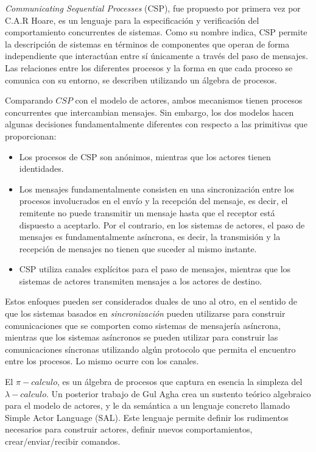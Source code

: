 \documentclass{article}
\begin{document}
\emph{Communicating Sequential Processes} (CSP), fue propuesto por primera vez por C.A.R Hoare\cite{Hoare:1978:CSP:359576.359585}, es un lenguaje para la especificación y verificación del comportamiento concurrentes de sistemas. Como su nombre indica, CSP permite la descripción de sistemas en términos de componentes que operan de forma independiente que interactúan entre sí únicamente a través del paso de mensajes. Las relaciones entre los diferentes procesos y la forma en que cada proceso se comunica con su entorno, se describen utilizando un álgebra de procesos.

Comparando $CSP$ con el modelo de actores, ambos mecanismos tienen procesos concurrentes que intercambian mensajes. Sin embargo, los dos modelos hacen algunas decisiones fundamentalmente diferentes con respecto a las primitivas que proporcionan:

\begin{itemize}
\item Los procesos de CSP son anónimos, mientras que los actores tienen identidades.
\item Los mensajes fundamentalmente consisten en una sincronización entre los procesos involucrados en el envío y la recepción del mensaje, es decir, el remitente no puede transmitir un mensaje hasta que el receptor está dispuesto a aceptarlo. Por el contrario, en los sistemas de actores, el paso de mensajes es fundamentalmente asíncrona, es decir, la transmisión y la recepción de mensajes no tienen que suceder al mismo instante.
\item CSP utiliza canales explícitos para el paso de mensajes, mientras que los sistemas de actores transmiten mensajes a los actores de destino.
\end{itemize}

Estos enfoques pueden ser considerados duales de uno al otro, en el sentido de que los sistemas basados en \emph{sincronización} pueden utilizarse para construir comunicaciones que se comporten como sistemas de mensajería asíncrona, mientras que los sistemas asíncronos se pueden utilizar para construir las comunicaciones síncronas utilizando algún protocolo que permita el encuentro entre los procesos. Lo mismo ocurre con los canales.

El $\pi-calculo$, es un álgebra de procesos que captura en esencia la simpleza del $\lambda-calculo$. Un posterior trabajo de Gul Agha\cite{apicalculus} crea un sustento teórico algebraico para el modelo de actores, y le da semántica a un lenguaje concreto llamado Simple Actor Language (SAL). Este lenguaje permite definir los rudimentos necesarios para construir actores, definir nuevos comportamientos, crear/enviar/recibir comandos.
\end{document}
